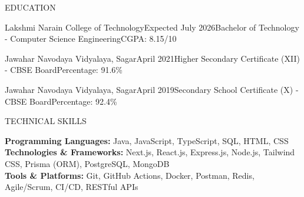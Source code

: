 \documentclass{resume}
\begin{document}
\begin{rSection}{EDUCATION}

\begin{rEducation}{Lakshmi Narain College of Technology}{Expected July 2026}{Bachelor of Technology - Computer Science Engineering}{CGPA: 8.15/10}
\end{rEducation}

\begin{rEducation}{Jawahar Navodaya Vidyalaya, Sagar}{April 2021}{Higher Secondary Certificate (XII) - CBSE Board}{Percentage: 91.6\%}
\end{rEducation}

\begin{rEducation}{Jawahar Navodaya Vidyalaya, Sagar}{April 2019}{Secondary School Certificate (X) - CBSE Board}{Percentage: 92.4\%}
\end{rEducation}

\end{rSection}

\begin{rSection}{TECHNICAL SKILLS}

\textbf{Programming Languages:} Java, JavaScript, TypeScript, SQL, HTML, CSS \\[2pt]
\textbf{Technologies \& Frameworks:} Next.js, React.js, Express.js, Node.js, Tailwind CSS, Prisma (ORM), PostgreSQL, MongoDB \\[2pt]
\textbf{Tools \& Platforms:} Git, GitHub Actions, Docker, Postman, Redis, Agile/Scrum, CI/CD, RESTful APIs

\end{rSection}
\end{document}
